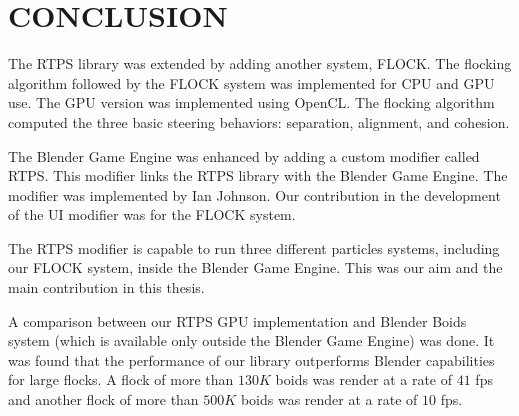 \chapter{CONCLUSION}\label{conclusionChapter}

The RTPS library was extended by adding another system, FLOCK. The flocking algorithm followed by the FLOCK system was implemented for CPU and GPU use. The GPU version was implemented using OpenCL. The flocking algorithm computed the three basic steering behaviors: separation, alignment, and cohesion. 

The Blender Game Engine was enhanced by adding a custom modifier called RTPS. This modifier links the RTPS library with the Blender Game Engine. The modifier was implemented by Ian Johnson. Our contribution in the development of the UI modifier was for the FLOCK system.

The RTPS modifier is capable to run three different particles systems, including our FLOCK system, inside the Blender Game Engine. This was our aim and the main contribution in this thesis.

A comparison between our RTPS GPU implementation and Blender Boids system (which is available only outside the Blender Game Engine) was done. It was found that the performance of our library outperforms Blender capabilities for large flocks. A flock of more than $130K$ boids was render at a rate of $41$ fps and another flock of more than $500K$ boids was render at a rate of $10$ fps. 

